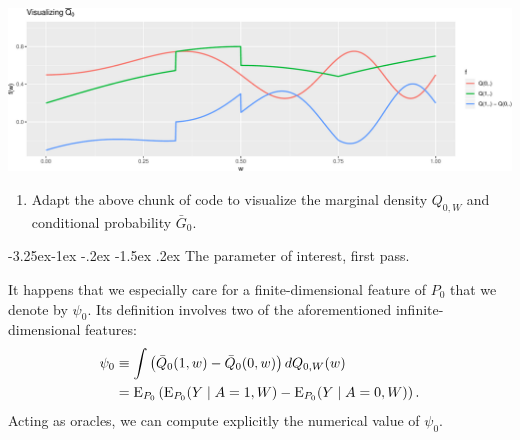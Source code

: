\documentclass[]{article}
\makeatletter
\newenvironment{Shaded}{\begin{snugshade}}{\end{snugshade}}
\newcommand{\ControlFlowTok}[1]{\textcolor[rgb]{0.13,0.29,0.53}{\textbf{#1}}}
\newcommand{\DataTypeTok}[1]{\textcolor[rgb]{0.13,0.29,0.53}{#1}}
\newcommand{\DecValTok}[1]{\textcolor[rgb]{0.00,0.00,0.81}{#1}}
\newcommand{\KeywordTok}[1]{\textcolor[rgb]{0.13,0.29,0.53}{\textbf{#1}}}
\newcommand{\NormalTok}[1]{#1}
\newcommand{\OperatorTok}[1]{\textcolor[rgb]{0.81,0.36,0.00}{\textbf{#1}}}
\newcommand{\StringTok}[1]{\textcolor[rgb]{0.31,0.60,0.02}{#1}}
\providecommand{\tightlist}{%
  \setlength{\itemsep}{0pt}\setlength{\parskip}{0pt}}
\renewcommand\subsection{\@startsection{subsection}{3}{\z@}%
                                     {-3.25ex\@plus -1ex \@minus -.2ex}%
                                     {-1.5ex \@plus .2ex}%
                                     {\normalfont\normalsize\bfseries}}
\newcommand{\Exp}{\textrm{E}}
\newcommand{\Gbar}{\bar{G}}
\newcommand{\Qbar}{\bar{Q}}
\theoremstyle{definition}
\theoremstyle{definition}
\theoremstyle{definition}
\theoremstyle{remark}
\makeatother
\begin{document}
\includegraphics{img/exercise:visualize-1.pdf}

\begin{enumerate}
\def\labelenumi{\arabic{enumi}.}
\setcounter{enumi}{1}
\tightlist
\item
  Adapt the above chunk of code to visualize the marginal density
  \(Q_{0,W}\) and conditional probability \(\Gbar_{0}\).
\end{enumerate}

\subsection{The parameter of interest, first pass.}
\label{subsec:parameter:first}

It happens that we especially care for a finite-dimensional feature of
\(P_{0}\) that we denote by \(\psi_{0}\). Its definition involves two of
the aforementioned infinite-dimensional features:
\begin{align}  \label{eq:psi0}
\psi_{0}  &\equiv   \int  \left(\Qbar_{0}(1,   w)  -   \Qbar_{0}(0,  w)\right)
dQ_{0,W}(w)\\  \notag  &=  \Exp_{P_{0}}   \left(\Exp_{P_0}(Y \mid A = 1,  W)  -  \Exp_{P_0}(Y \mid A = 0,  W) \right).   \end{align}
Acting as oracles, we can compute explicitly the numerical value of
\(\psi_{0}\).

\begin{Shaded}
\end{Shaded}
\end{document}
